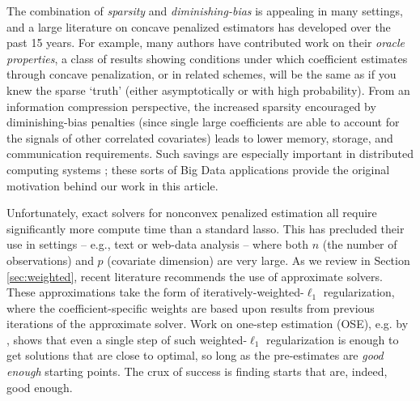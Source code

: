 \documentclass[12pt]{article}
\begin{document}
The combination of  \textit{sparsity} and \textit{diminishing-bias} 
 is appealing in many settings, and a large literature on concave
penalized estimators has developed over the past 15 years.  For example, many
authors \citep{fan_variable_2001,fan_nonconcave_2004}  have contributed work on their \textit{oracle
properties}, a class of results showing conditions under which coefficient
estimates through concave penalization, or in related schemes, will be the
same as if you knew the sparse `truth' (either asymptotically or with high
probability).   From an information compression perspective,  the increased
sparsity encouraged by diminishing-bias penalties (since single large
coefficients are able to account for the signals of other correlated
covariates) leads to lower memory, storage, and communication requirements.
Such savings are especially important in distributed  computing systems
\citep[e.g.,][]{taddy_distributed_2015,gentzkow_measuring_2015}; these sorts of Big Data applications provide the original motivation behind our work in this article.


Unfortunately,  exact solvers for nonconvex penalized estimation  all require
significantly more compute time than a standard lasso.  This has precluded their use in settings -- e.g., text or web-data analysis
-- where both $n$ (the number of observations) and $p$ (covariate dimension)
   are very large. As we review in Section \ref{sec:weighted},  recent
   literature recommends the use of approximate solvers. These approximations
   take the form of iteratively-weighted-$\ell_1$ regularization, where the
   coefficient-specific weights are based upon results from previous
   iterations of the approximate solver.  Work on one-step estimation (OSE),
   e.g. by
   \cite{zou_one-step_2008}, shows that even a single step of such
   weighted-$\ell_1$ regularization is enough to get solutions that are close to
   optimal, so long as the pre-estimates are
\textit{good enough} starting points. 
The crux of success is  finding starts that are, indeed, good enough.
\end{document}
